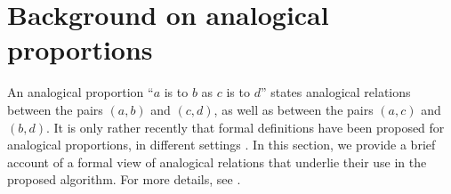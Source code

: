 \documentclass{llncs}
\begin{document}
\section{Background on analogical proportions}\label{backAnalogy}
An analogical proportion ``$a$ is to $b$ as $c$ is to $d$'' states analogical relations between the pairs $(a,b)$ and $(c,d)$, as well as between the pairs $(a,c)$ and $(b,d)$. 
It is only rather recently that formal definitions have been proposed for analogical proportions, in different settings  \cite{StroppaYvon2006,LepageHDR2003,MicPraECSQARU2009}. In this section, we provide a brief account of a formal view of analogical relations that underlie their use in the proposed algorithm.
For more details, see \cite{PraRicLU2013,PraRicECSQARU2013,PraRicIFCOLOG2014}. 
 
\end{document}
